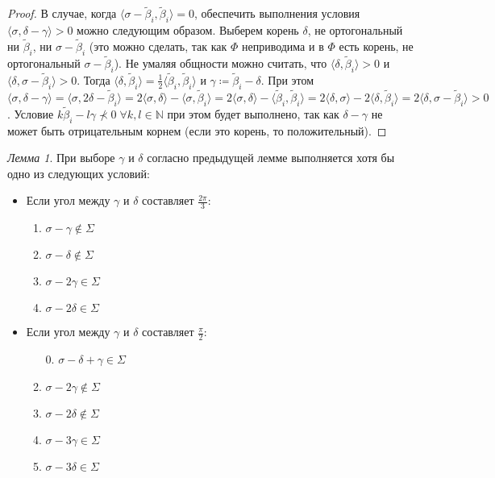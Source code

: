 \documentclass[10pt]{article}
\theoremstyle{remark}
\newtheorem{lm}{Лемма}
\newcommand{\N}{\mathbb{N}}
\begin{document}
\begin{proof}
В случае, когда $\langle\sigma-\widetilde\beta_i,\widetilde\beta_i\rangle=0$, обеспечить выполнения условия $\langle\sigma,\delta-\gamma\rangle>0$ можно следующим образом. Выберем корень $\delta$, не ортогональный ни $\widetilde\beta_i$, ни $\sigma-\widetilde\beta_i$ (это можно сделать, так как $\Phi$ неприводима и в $\Phi$ есть корень, не ортогональный $\sigma-\widetilde\beta_i$). Не умаляя общности можно считать, что $\langle\delta,\widetilde\beta_i\rangle>0$ и $\langle\delta,\sigma-\widetilde\beta_i\rangle>0$. Тогда $\langle\delta,\widetilde\beta_i\rangle=\frac{1}{2}\langle\widetilde\beta_i,\widetilde\beta_i\rangle$ и $\gamma\coloneqq\widetilde\beta_i-\delta$. При этом
$\langle\sigma,\delta-\gamma\rangle =
\langle\sigma,2\delta-\widetilde\beta_i\rangle =
2\langle\sigma,\delta\rangle-\langle\sigma,\widetilde\beta_i\rangle = 
2\langle\sigma,\delta\rangle-\langle\widetilde\beta_i,\widetilde\beta_i\rangle =
2\langle\delta,\sigma\rangle-2\langle\delta,\widetilde\beta_i\rangle =
2\langle\delta,\sigma-\widetilde\beta_i\rangle > 0$.
Условие $k\widetilde\beta_i-l\gamma\nprec 0\;\forall k,l\in\N$ при этом будет выполнено, так как  $\delta-\gamma$ не может быть отрицательным корнем (если это корень, то положительный).
\end{proof}

\begin{lm}\label{highestweightvariants}
При выборе $\gamma$ и $\delta$ согласно предыдущей лемме выполняется хотя бы одно из следующих условий:
\begin{itemize}
\item Если угол между $\gamma$ и $\delta$ составляет $\frac{2\pi}{3}$:
\begin{enumerate}
\item $ \sigma - \gamma \notin \Sigma$
\item $ \sigma - \delta \notin \Sigma$
\item $ \sigma - 2\gamma \in \Sigma$
\item $ \sigma - 2\delta \in \Sigma$
\end{enumerate}
\item Если угол между $\gamma$ и $\delta$ составляет $\frac{\pi}{2}$:
\begin{enumerate}
\item[0.] $ \sigma - \delta + \gamma \in \Sigma$
\item $ \sigma - 2\gamma \notin \Sigma$
\item $ \sigma - 2\delta \notin \Sigma$
\item $ \sigma - 3\gamma \in \Sigma$
\item $ \sigma - 3\delta \in \Sigma$
\end{enumerate}
\end{itemize}
\end{lm}
\end{document}

